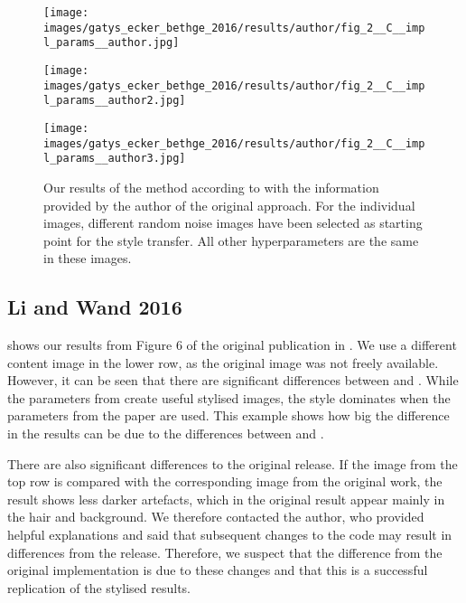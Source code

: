 \begin{figure}[H]
	\centering
	\begin{minipage}[t]{0.3\textwidth}
		\centering
		\texttt{[image: images/gatys\_ecker\_bethge\_2016/results/author/fig\_2\_\_C\_\_impl\_params\_\_author.jpg]}
	\end{minipage}
	\hfill%
	\begin{minipage}[t]{0.3\textwidth}
		\centering
		\texttt{[image: images/gatys\_ecker\_bethge\_2016/results/author/fig\_2\_\_C\_\_impl\_params\_\_author2.jpg]}
	\end{minipage}
	\hfill%
	\begin{minipage}[t]{0.3\textwidth}
		\centering
		\texttt{[image: images/gatys\_ecker\_bethge\_2016/results/author/fig\_2\_\_C\_\_impl\_params\_\_author3.jpg]}
	\end{minipage}
	\caption{Our results of the method according to \cite{GEB2016} with the information provided by the author of the original approach. For the individual images, different random noise images have been selected as starting point for the style transfer. All other hyperparameters are the same in these images.}
	\label{fig:GEB2016_random_init}
\end{figure}


\subsection{Li and Wand 2016}
 shows our results from Figure 6 of the original publication in \cite{LW2016}. We use a different content image in the lower row, as the original image was not freely available. However, it can be seen that there are significant differences between \paper{} and \implementation{}. While the parameters from \implementation{} create useful stylised images, the style dominates when the parameters from the paper are used. This example shows how big the difference in the results can be due to the differences between \paper{} and \implementation{}. 

There are also significant differences to the original release. If the image from the top row is compared with the corresponding image from the original work, the result shows less darker artefacts, which in the original result appear mainly in the hair and background. We therefore contacted the author, who provided helpful explanations and said that subsequent changes to the code may result in differences from the release. Therefore, we suspect that the difference from the original implementation is due to these changes and that this is a successful replication of the stylised results.


